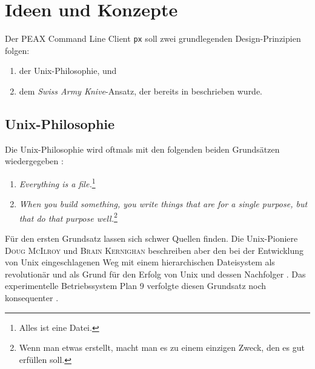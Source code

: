 \section{Ideen und Konzepte}

Der PEAX Command Line Client \texttt{px} soll zwei grundlegenden Design-Prinzipien folgen:

\begin{enumerate}
    \item der Unix-Philosophie, und
    \item dem \textit{Swiss Army Knive}-Ansatz, der bereits in  beschrieben wurde.
\end{enumerate}

\subsection{Unix-Philosophie}

Die Unix-Philosophie wird oftmals mit den folgenden beiden Grundsätzen wiedergegeben \cite[12:51]{the-code-linux}:

\begin{enumerate}
    \item \textit{Everything is a file.}\footnote{Alles ist eine Datei.}
    \item \textit{When you build something, you write things that are for a single purpose, but that do that purpose well.}\footnote{Wenn man etwas erstellt, macht man es zu einem einzigen Zweck, den es gut erfüllen soll.}
\end{enumerate}

Für den ersten Grundsatz lassen sich schwer Quellen finden. Die Unix-Pioniere \textsc{Doug McIlroy} und \textsc{Brain Kernighan} beschreiben aber den bei der Entwicklung von Unix eingeschlagenen Weg mit einem hierarchischen Dateisystem als revolutionär und als Grund für den Erfolg von Unix und dessen Nachfolger \cite[Kapitel 4.1, S. 62-62, und Kapitel 9.1, S. 166]{unix-history-memoir}. Das experimentelle Betriebssystem Plan 9 verfolgte diesen Grundsatz noch konsequenter \cite[Kapitel 8.4, S. 161]{unix-history-memoir}.

